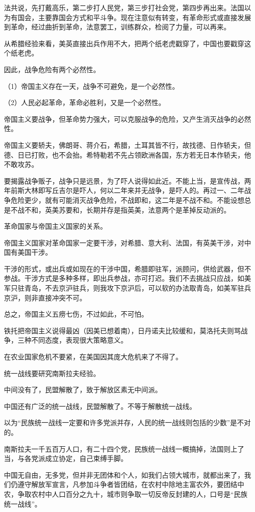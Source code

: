 法共说，先打戴高乐，第二步打人民党，第三步打社会党，第四步再出来。法国以为有国会，主要靠国会方式和平斗争。现在注意似有转变，有革命形式或直接发展到革命，经过曲折到革命，法意罢工，训练群众，检阅了力量，可以再来。

从希腊经验来看，美英直接出兵作用不大，把两个纸老虎戳穿了，中国也要戳穿这个纸老虎。

因此，战争危险有两个必然性。

（1）帝国主义存在一天，战争不可避免，是一个必然性。

（2）人民必起革命，革命必胜利，又是一个必然性。

帝国主义要战争，但革命势力强大，可以克服战争的危险，又产生消灭战争的必然性。

帝国主义要轿夫，佛朗哥、蒋介石，希腊，土耳其皆不行，故找德、日作轿夫，但德、日已打败，也不会抬。希特勒若不先占领欧洲各国，东方若无日本作轿夫，他不敢攻苏。

要揭露战争贩子，战争只是远景，为了吓人说得如此近。不能上当，是宣传战，两年前斯大林即写丘吉尔是吓人，何以二年来并无战争，是吓人的。再过一、二年战争危险更少，就有可能消灭战争危险，不战即和，这二年是不战不和。不能设想总是不战不和，英美苏要和，长期并存是指英美，法意两个是革掉反动派的。

革命国家与帝国主义国家的关系。

帝国主义国家对革命国家一定要干涉，对希腊、意大利、法国，有英美干涉，对中国有美国干涉。

干涉的形式，或出兵或如现在的干涉中国，希腊即驻军，派顾问，供给武器，但不参战。干涉方式是多种多样，即出兵参战，亦可打迟。我们不去挑战只应战，如美军只驻青岛，不去京沪驻兵，则我攻下京沪后，可以软的办法取青岛，如美军驻兵京沪，则非直接冲突不可。

总之，帝国主义五痨七伤，不过如此，不可怕。

铁托把帝国主义说得最凶（因美已想着南），日丹诺夫比较缓和，莫洛托夫则骂战争，三种不同态度，表现很大策略意义。

在农业国家危机不要紧，在美国因其庞大危机来了不得了。

统一战线要研究南斯拉夫经验。

中间没有了，民盟解散了，致于解放区素无中间派。

中国还有广泛的统一战线，民盟解散了。不等于解散统一战线。

以为“民族统一战线一定要和许多党派并存，人民的统一战线则包括的少数”是不对的。

南斯拉夫一千五百万人口，有二十四个党，民族统一战线一概搞掉，法国则上了当，与各党派成立协定，自己束缚手脚。

中国无自由，无多党，但并非无团体和个人，如我们占领大城市，就都出来了，我们仍遵守解放军宣言，凡参加斗争者皆团结，在农村中除地主富农外，要团结中农，争取农村中人口百分之九十，城市则争取一切反帝反封建的人，口号是“民族统一战线”。

